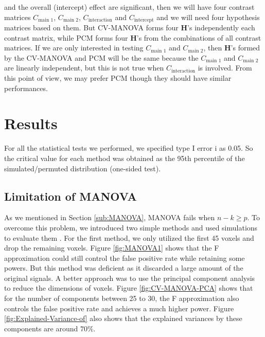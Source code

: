 \documentclass[english]{article}\usepackage[]{graphicx}\usepackage[]{color}
\begin{document}
and the overall (intercept) effect are significant, then we will have
four contrast matrices $C_{\text{main 1}}$, $C_{\text{main 2}}$,
$C_{\text{interaction}}$ and $C_{\text{intercept}}$ and we will
need four hypothesis matrices based on them. But CV-MANOVA forms four
$\boldsymbol{H}$'s independently each contrast matrix, while PCM
forms four $\boldsymbol{H}$'s from the combinations of all contrast
matrices. If we are only interested in testing $C_{\text{main 1}}$
and $C_{\text{main 2}}$, then $\boldsymbol{H}$'s formed by the CV-MANOVA
and PCM will be the same because the $C_{\text{main 1}}$ and $C_{\text{main 2}}$
are linearly independent, but this is not true when $C_{\text{interaction}}$
is involved. From this point of view, we may prefer PCM though they
should have similar performances.


\section{Results}

For all the statistical tests we performed, we specified type I error
i as 0.05. So the critical value for each method was obtained as the
95th percentile of the simulated/permuted distribution (one-sided
test).


\subsection{Limitation of MANOVA}

As we mentioned in Section \ref{sub:MANOVA}, MANOVA fails when $n-k\ge p$.
To overcome this problem, we introduced two simple methods and used
simulations to evaluate them . For the first method, we only utilized
the first 45 voxels and drop the remaining voxels. Figure \ref{fig:MANOVA1}
shows that the F approximation could still control the false positive
rate while retaining some powers. But this method was deficient as
it discarded a large amount of the original signals. A better approach
was to use the principal component analysis to reduce the dimensions
of voxels. Figure \ref{fig:CV-MANOVA-PCA} shows that for the number
of components between 25 to 30, the F approximation also controls
the false positive rate and achieves a much higher power. Figure \ref{fig:Explained-Variance-of}
also shows that the explained variances by these components are around
$70\%$.
\end{document}

